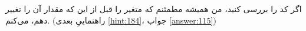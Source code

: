 \section{}
\paragraph{}\label{hint:282}
اگر کد را بررسی کنید، من همیشه مطمئنم که متغیر  را قبل از این که مقدار آن را تغییر دهم،  می‌کنم. (راهنماییِ بعدی \ref{hint:184}، جواب \ref{answer:115})